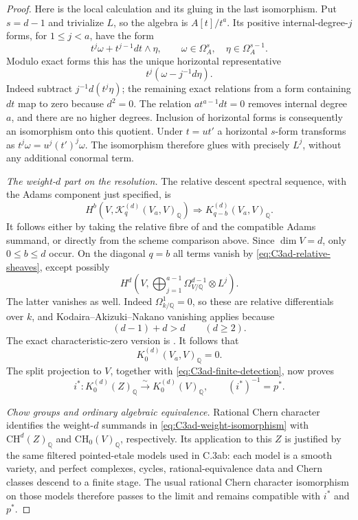 \begin{proof}
Here is the local calculation and its gluing in the last
isomorphism. Put $s=d-1$ and trivialize $L$, so the algebra
is $A[t]/t^a$. Its positive internal-degree-$j$ forms, for
$1\le j<a$, have the form
\[
              t^j\omega+t^{j-1}dt\wedge\eta,
 \qquad \omega\in\Omega_A^s,
        \quad\eta\in\Omega_A^{s-1}.
\]
Modulo exact forms this has the unique horizontal
representative
\begin{equation}\label{eq:C3ad-horizontal}
              t^j(\omega-j^{-1}d\eta).
\end{equation}
Indeed subtract $j^{-1}d(t^j\eta)$; the remaining exact
relations from a form containing $dt$ map to zero because
$d^2=0$. The relation $a t^{a-1}dt=0$ removes internal
degree $a$, and there are no higher degrees. Inclusion
of horizontal forms is consequently an isomorphism onto
this quotient. Under $t=u t'$ a horizontal $s$-form
transforms as $t^j\omega=u^j(t')^j\omega$.
The isomorphism therefore glues with precisely $L^j$,
without any additional conormal term.

\emph{The weight-$d$ part on the resolution.}
The relative descent spectral sequence, with the Adams
component just specified, is
\[
 H^b(V,\mathcal K_q^{(d)}(V_a,V)_{\mathbb Q})
                         \Longrightarrow K_{q-b}^{(d)}(V_a,V)_{\mathbb Q}.
\]
It follows either by taking the relative fibre of
\citet[Theorem 10.3]{D_ThomasonTrobaugh1990} and the compatible
Adams summand, or directly from the scheme comparison above.
Since $\dim V=d$, only $0\le b\le d$ occur. On the
diagonal $q=b$ all terms vanish by
\eqref{eq:C3ad-relative-sheaves}, except possibly
\[
 H^d\!\left(V,
      \bigoplus_{j=1}^{a-1}\Omega^{d-1}_{V/\mathbb Q}\otimes L^j\right).
\]
The latter vanishes as well. Indeed
$\Omega^1_{k/\mathbb Q}=0$, so these are relative
differentials over $k$, and Kodaira--Akizuki--Nakano
vanishing applies because
\[
                     (d-1)+d>d\qquad(d\ge2).
\]
The exact characteristic-zero version is
\citet[Theorem 1.3(a) and Section 8]{D_EsnaultViehweg1992}.
It follows that
\[
                     K_0^{(d)}(V_a,V)_{\mathbb Q}=0.
\]
The split projection to $V$, together with
\eqref{eq:C3ad-finite-detection}, now proves
\begin{equation}\label{eq:C3ad-weight-isomorphism}
              i^*:K_0^{(d)}(Z)_{\mathbb Q}
                   \xrightarrow{\sim}K_0^{(d)}(V)_{\mathbb Q},
                        \qquad(i^*)^{-1}=p^*.
\end{equation}

\emph{Chow groups and ordinary algebraic equivalence.}
Rational Chern character identifies the weight-$d$
summands in \eqref{eq:C3ad-weight-isomorphism} with
$\mathrm{CH}^d(Z)_{\mathbb Q}$ and
$\mathrm{CH}_0(V)_{\mathbb Q}$, respectively. Its application
to this $Z$ is justified by the same filtered pointed-etale
models used in C.3ab: each model is a smooth variety, and
perfect complexes, cycles, rational-equivalence data and
Chern classes descend to a finite stage. The usual
rational Chern character isomorphism on those models
\citep[Example 15.2.16, pp.~294--295]{frC4Fulton1998} therefore passes to
the limit and remains compatible with $i^*$ and $p^*$.


\end{proof}
